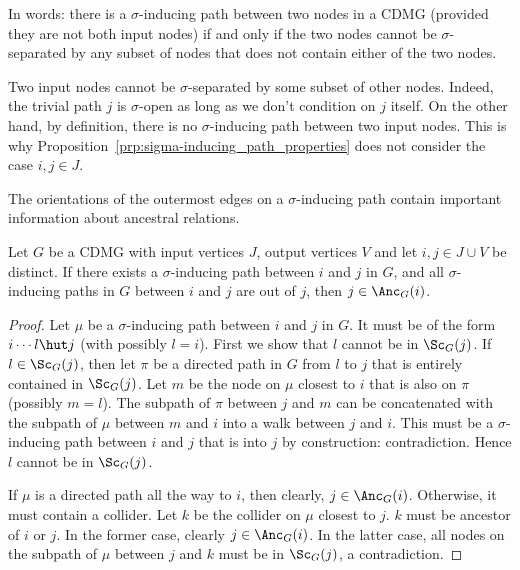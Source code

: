 In words: there is a $\sigma$-inducing path between two nodes in a CDMG (provided they are not both input nodes) if and only if the two nodes cannot be $\sigma$-separated by any subset of nodes that does not contain either of the two nodes.
\begin{Rem}
Two input nodes cannot be $\sigma$-separated by some subset of other nodes.
Indeed, the trivial path $j$ is $\sigma$-open as long as we don't condition on $j$ itself.
On the other hand, by definition, there is no $\sigma$-inducing path between two input nodes.
This is why Proposition~\ref{prp:sigma-inducing_path_properties} does not consider the case $i,j \in J$.
\end{Rem}

The orientations of the outermost edges on a $\sigma$-inducing path contain important information about ancestral relations.
\begin{Lem}\label{lem:sigma-inducing_path_out-of}
  Let $G$ be a CDMG with input vertices $J$, output vertices $V$ and let $i,j \in J \cup V$ be distinct. 
  If there exists a $\sigma$-inducing path between $i$ and $j$ in $G$,
  and all $\sigma$-inducing paths in $G$ between $i$ and $j$ are out of $j$, then $j \in \Anc_G(i)$.
\end{Lem}
\begin{proof}
  Let $\mu$ be a $\sigma$-inducing path between $i$ and $j$ in $G$. 
  It must be of the form $i \cdots l \hut j$ (with possibly $l = i$). 
  First we show that $l$ cannot be in $\Sc_G(j)$.
  If $l \in \Sc_G(j)$, then let $\pi$ be a directed path in $G$ from $l$ to $j$ that is entirely contained in $\Sc_G(j)$.
  Let $m$ be the node on $\mu$ closest to $i$ that is also on $\pi$ (possibly $m = l$).
  The subpath of $\pi$ between $j$ and $m$ can be concatenated with the subpath of $\mu$ between $m$ and $i$ into a walk between $j$ and $i$.
  This must be a $\sigma$-inducing path between $i$ and $j$ that is into $j$ by construction: contradiction.
  Hence $l$ cannot be in $\Sc_G(j)$.

  If $\mu$ is a directed path all the way to $i$, then clearly, $j \in \Anc_G(i)$.
  Otherwise, it must contain a collider. 
  Let $k$ be the collider on $\mu$ closest to $j$.
  $k$ must be ancestor of $i$ or $j$.
  In the former case, clearly $j \in \Anc_G(i)$.
  In the latter case, all nodes on the subpath of $\mu$ between $j$ and $k$ must be in $\Sc_G(j)$, a contradiction.
\end{proof}


